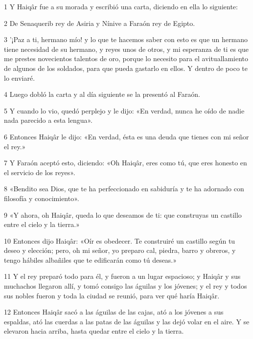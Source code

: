 \par 1 Y Haiqâr fue a su morada y escribió una carta, diciendo en ella lo siguiente:

\par 2 De Senaquerib rey de Asiria y Nínive a Faraón rey de Egipto.

\par 3 '¡Paz a ti, hermano mío! y lo que te hacemos saber con esto es que un hermano tiene necesidad de su hermano, y reyes unos de otros, y mi esperanza de ti es que me prestes novecientos talentos de oro, porque lo necesito para el avituallamiento de algunos de los soldados, para que pueda gastarlo en ellos. Y dentro de poco te lo enviaré.

\par 4 Luego dobló la carta y al día siguiente se la presentó al Faraón.

\par 5 Y cuando lo vio, quedó perplejo y le dijo: «En verdad, nunca he oído de nadie nada parecido a esta lengua».

\par 6 Entonces Haiqâr le dijo: «En verdad, ésta es una deuda que tienes con mi señor el rey.»

\par 7 Y Faraón aceptó esto, diciendo: «Oh Haiqâr, eres como tú, que eres honesto en el servicio de los reyes».

\par 8 «Bendito sea Dios, que te ha perfeccionado en sabiduría y te ha adornado con filosofía y conocimiento».

\par 9 «Y ahora, oh Haiqâr, queda lo que deseamos de ti: que construyas un castillo entre el cielo y la tierra.»

\par 10 Entonces dijo Haiqâr: «Oír es obedecer. Te construiré un castillo según tu deseo y elección; pero, oh mi señor, yo preparo cal, piedra, barro y obreros, y tengo hábiles albañiles que te edificarán como tú deseas.»

\par 11 Y el rey preparó todo para él, y fueron a un lugar espacioso; y Haiqâr y sus muchachos llegaron allí, y tomó consigo las águilas y los jóvenes; y el rey y todos sus nobles fueron y toda la ciudad se reunió, para ver qué haría Haiqâr.

\par 12 Entonces Haiqâr sacó a las águilas de las cajas, ató a los jóvenes a sus espaldas, ató las cuerdas a las patas de las águilas y las dejó volar en el aire. Y se elevaron hacia arriba, hasta quedar entre el cielo y la tierra.

